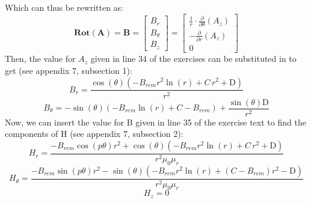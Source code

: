 \documentclass{article}
\begin{document}
Which can thus be rewritten as:
\begin{equation}
   \mathbf{Rot(A)} =  \mathbf{B}=\left[\begin{array}{c}
B_{r} 
\\
 B_{\theta} 
\\
 B_{z} 
\end{array}\right]=\left[\begin{array}{c}
\frac{1}{r}\cdot \frac{\partial}{\partial \theta}\left(A_{z}\right) 
\\
 -\frac{\partial}{\partial r}\left(A_{z}\right) 
\\
 0 
\end{array}\right]
\end{equation}
Then, the value for $A_z$ given in line 34 of the exercises can be substituted in to get (see appendix 7, subsection 1):
\begin{equation}
    B_{r} = \frac{\cos(\theta) \left(-B_{\mathit{rem}} r^{2} \ln (r)+C \,r^{2}+\mathrm{D}\right)}{r^{2}}
\end{equation}    
\begin{equation}
    B_{\theta} = -\sin \left(\theta\right) \left(-B_{\mathit{rem}} \ln\! \left(r\right)+C-B_{\mathit{rem}}\right)+\frac{\sin\! \left(\theta\right) \mathrm{D}}{r^{2}}
\end{equation}
Now, we can insert the value for B given in line 35 of the exercise text to find the components of H (see appendix 7, subsection 2):
\begin{equation}
    H_r= \frac{-B_{\mathit{rem}} \cos \left(p \theta\right) r^{2}+\cos \left(\theta\right) \left(-B_{\mathit{rem}} r^{2} \ln \left(r\right)+C \,r^{2}+\mathrm{D}\right)}{r^{2} \mu_{0} \mu_{r}}
\end{equation}
\begin{equation}
    H_\theta = \frac{-B_{\mathit{rem}} \sin \left(p \theta\right) r^{2}-\sin \left(\theta\right) \left(-B_{\mathit{rem}} r^{2} \ln \left(r\right)+\left(C-B_{\mathit{rem}}\right) r^{2}-\mathrm{D}\right)}{r^{2} \mu_{0} \mu_{r}}
\end{equation}
\begin{equation}
    H_{z}=0
\end{equation}
\end{document}
